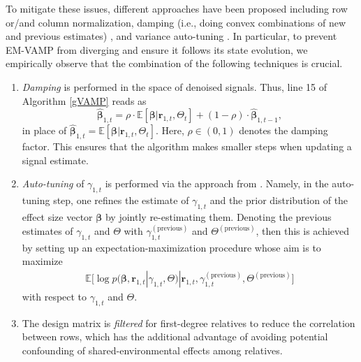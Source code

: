 To mitigate these issues, different approaches have been proposed including row or/and column normalization, damping (i.e., doing convex combinations of new and previous estimates) \cite{VAMP_MRI,sarkar2021mri}, and variance auto-tuning \cite{RigorousDynamics2017}. In particular, to prevent EM-VAMP from diverging and ensure it follows its state evolution, we empirically observe that the combination of the following techniques is crucial.  
\begin{enumerate}
    \item \emph{Damping} is performed in the space of denoised signals. Thus, line 15 of Algorithm \ref{gVAMP} reads as
    \begin{equation}
        \hat{\bm{\beta}}_{1,t} = \rho \cdot \mathbb{E}[\bm{\beta} | \bm{r}_{1,t}, \Theta_{t}] + (1-\rho) \cdot \hat{\bm{\beta}}_{1,t-1},
    \end{equation}   
in place of $\hat{\bm{\beta}}_{1,t} = \mathbb{E}[\bm{\beta} | \bm{r}_{1,t}, \Theta_{t}]$. Here, $\rho \in ( 0, 1 )$ denotes the damping factor. This ensures that the algorithm makes smaller steps when updating a signal estimate. 
    \item \emph{Auto-tuning} of $\gamma_{1,t}$ is performed via the approach from \cite{RigorousDynamics2017}. Namely, in the auto-tuning step, one refines the estimate of $\gamma_{1,t}$ and the prior distribution of the effect size vector $\bm{\beta}$ by jointly re-estimating them. Denoting the previous estimates of $\gamma_{1, t}$ and $\Theta$ with $\gamma_{1, t}^{(\text{previous})}$ and $\Theta^{(\text{previous})}$, then this is achieved by setting up an expectation-maximization procedure whose aim is to maximize 
\begin{align}
    \mathbb{E} \big [ \log p(\bm{\beta}, \bm{r}_{1, t}|\gamma_{1, t}, \Theta) | \bm{r}_{1, t}, \gamma_{1, t}^{(\text{previous})}, \Theta^{(\text{previous})} \big ]
\end{align}
with respect to $\gamma_{1, t}$ and $\Theta$.
\item 
The design matrix is \emph{filtered} for first-degree relatives to reduce the correlation between rows, which has the additional advantage of avoiding potential confounding of shared-environmental effects among relatives. 
\end{enumerate}

